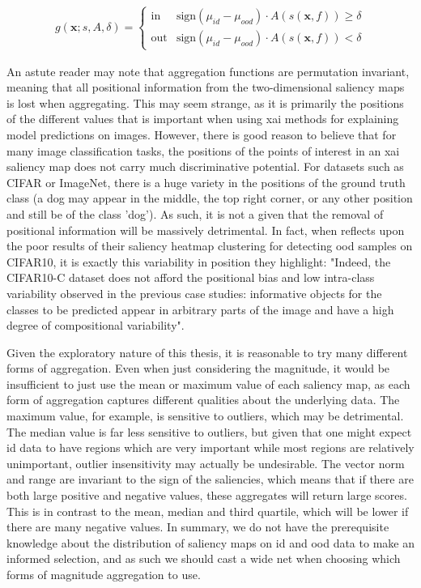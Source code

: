 \documentclass[UKenglish]{uiomasterthesis} %
\theoremstyle{definition}
\begin{document}
\begin{align} \label{eq:salagg_def}
    g(\bm{x}; s, A, \delta)=\begin{cases} 
        \text{in } & \text{sign}(\mu_{id} - \mu_{ood}) \cdot A(s(\bm{x}, f)) \ge \delta \\
        \text{out} & \text{sign}(\mu_{id} - \mu_{ood}) \cdot A(s(\bm{x}, f)) < \delta 
   \end{cases}
\end{align}

An astute reader may note that aggregation functions are permutation invariant, meaning that all positional information from the two-dimensional saliency maps is lost when aggregating. This may seem strange, as it is primarily the positions of the different values that is important when using \ac{xai} methods for explaining model predictions on images. However, there is good reason to believe that for many image classification tasks, the positions of the points of interest in an \ac{xai} saliency map does not carry much discriminative potential. For datasets such as CIFAR or ImageNet, there is a huge variety in the positions of the ground truth class (a dog may appear in the middle, the top right corner, or any other position and still be of the class 'dog'). As such, it is not a given that the removal of positional information will be massively detrimental. In fact, when \cite{martinez} reflects upon the poor results of their saliency heatmap clustering for detecting \ac{ood} samples on CIFAR10, it is exactly this variability in position they highlight: "Indeed, the CIFAR10-C dataset does not afford the positional bias and low intra-class variability observed in the previous case studies: informative objects for the classes to be predicted appear in arbitrary parts of the image and have a high degree of compositional variability".

Given the exploratory nature of this thesis, it is reasonable to try many different forms of aggregation. Even when just considering the magnitude, it would be insufficient to just use the mean or maximum value of each saliency map, as each form of aggregation captures different qualities about the underlying data. The maximum value, for example, is sensitive to outliers, which may be detrimental. The median value is far less sensitive to outliers, but given that one might expect \ac{id} data to have regions which are very important while most regions are relatively unimportant, outlier insensitivity may actually be undesirable. The vector norm and range are invariant to the sign of the saliencies, which means that if there are both large positive and negative values, these aggregates will return large scores. This is in contrast to the mean, median and third quartile, which will be lower if there are many negative values. In summary, we do not have the prerequisite knowledge about the distribution of saliency maps on \ac{id} and \ac{ood} data to make an informed selection, and as such we should cast a wide net when choosing which forms of magnitude aggregation to use.
\end{document}
